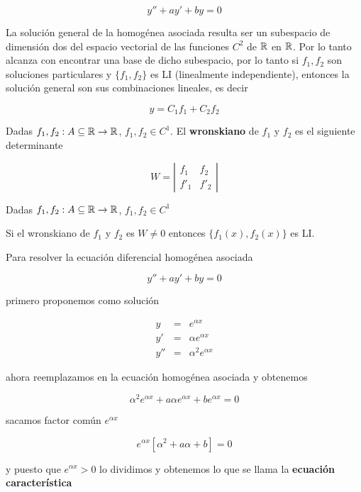 $$ y'' + ay' + by = 0 $$

La solución general de la homogénea asociada resulta ser un subespacio de dimensión dos del espacio vectorial de las funciones $C^2$ de $\mathbb{R}$ en $\mathbb{R}$.  Por lo tanto alcanza con encontrar una base de dicho subespacio, por lo tanto si $f_1, f_2$ son soluciones particulares y $ \{f_1, f_2\}$ es LI (linealmente independiente), entonces la solución general son sus combinaciones lineales, es decir

$$ y = C_1 f_1 + C_2 f_2 $$

\begin{definition}

Dadas $f_1, f_2 : A \subseteq \mathbb{R} \to \mathbb{R}$, $f_1, f_2 \in C^1$.  El \textbf{wronskiano} de $f_1$ y $f_2$ es el siguiente determinante

$$ W = \left| \begin{matrix} f_1 & f_2 \\ f'_1 & f'_2 \end{matrix} \right| $$

\end{definition}

\begin{proposition}

Dadas $f_1, f_2 : A \subseteq \mathbb{R} \to \mathbb{R}$, $f_1, f_2 \in C^1$

Si el wronskiano de $f_1$ y $f_2$ es $ W \neq 0$ entonces $ \{f_1(x), f_2(x) \}$ es LI.

\end{proposition}

Para resolver la ecuación diferencial homogénea asociada

$$ y'' + ay' + by = 0 $$

primero proponemos como solución 

\begin{eqnarray*} y &=& e^{\alpha x} \\
y' &=& \alpha e^{\alpha x} \\ 
y'' &=& \alpha^2 e^{\alpha x} \end{eqnarray*}

ahora reemplazamos en la ecuación homogénea asociada y obtenemos

$$ \alpha^2 e^{\alpha x} + a \alpha e^{\alpha x} + b e^{\alpha x} = 0 $$

sacamos factor común $e^{\alpha x}$

$$ e^{\alpha x} [ \alpha^2 + a \alpha + b ] = 0 $$

y puesto que $e^{\alpha x} > 0$ lo dividimos y obtenemos lo que se llama la \textbf{ecuación característica}

